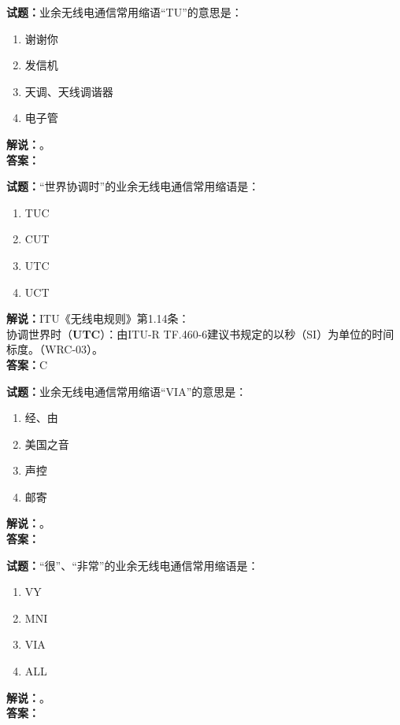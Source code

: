 \documentclass{ctexbook}
\begin{document}
\vspace{\baselineskip}

\noindent\textbf{试题：}业余无线电通信常用缩语“TU”的意思是：
\begin{enumerate}[leftmargin=3em]
  \item 谢谢你
  \item 发信机
  \item 天调、天线调谐器
  \item 电子管
\end{enumerate}
\noindent\textbf{解说：}\textbf{}。\\\noindent\textbf{答案：}

\vspace{\baselineskip}

\noindent\textbf{试题：}“世界协调时”的业余无线电通信常用缩语是：
\begin{enumerate}[leftmargin=3em]
  \item TUC
  \item CUT
  \item UTC
  \item UCT
\end{enumerate}
\noindent\textbf{解说：}ITU《无线电规则》第1.14条：\\协调世界时（\textbf{UTC}）：由ITU-R TF.460-6建议书规定的以秒（SI）为单位的时间标度。（WRC-03）。\\\noindent\textbf{答案：}C

\vspace{\baselineskip}

\noindent\textbf{试题：}业余无线电通信常用缩语“VIA”的意思是：
\begin{enumerate}[leftmargin=3em]
  \item 经、由
  \item 美国之音%
  \item 声控
  \item 邮寄
\end{enumerate}
\noindent\textbf{解说：}\textbf{}。\\\noindent\textbf{答案：}

\vspace{\baselineskip}

\noindent\textbf{试题：}“很”、“非常”的业余无线电通信常用缩语是：
\begin{enumerate}[leftmargin=3em]
  \item VY
  \item MNI
  \item VIA
  \item ALL
\end{enumerate}
\noindent\textbf{解说：}\textbf{}。\\\noindent\textbf{答案：}
\end{document}
